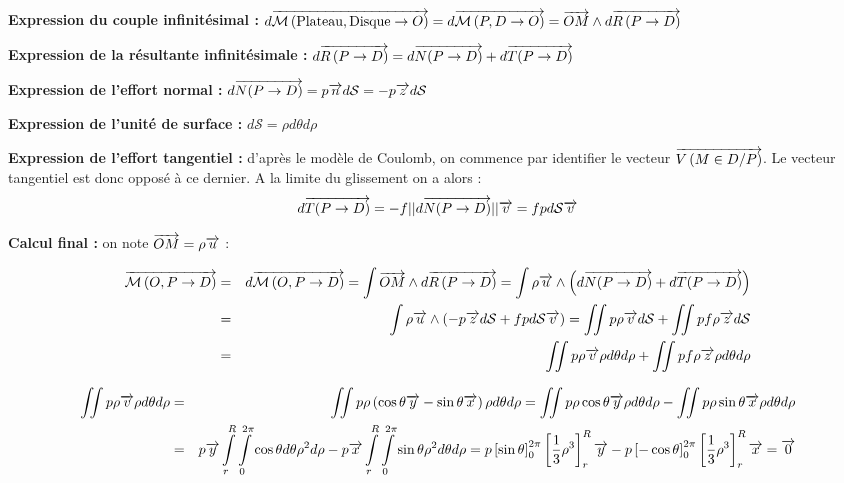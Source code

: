 \documentclass[10pt,fleqn]{article} %
\begin{document}
\textbf{Expression du couple infinitésimal : }$
d\overrightarrow{\mathcal{M}\left( {\text{Plateau}}, {\text{Disque}} \rightarrow {O}\right)} =
d\overrightarrow{\mathcal{M}\left( {P}, {D} \rightarrow {O}\right)} =  \overrightarrow{OM}\wedge d\overrightarrow{R\left( {P} \rightarrow {D}\right)}
$

\textbf{Expression de la résultante infinitésimale : } 
$d\overrightarrow{R\left( {P} \rightarrow {D}\right)} = d\overrightarrow{N(P\rightarrow D)}+d\overrightarrow{T(P\rightarrow D)}$

\textbf{Expression de l'effort normal : }
$ d\overrightarrow{N(P\rightarrow D)} = p \overrightarrow{n} d\mathcal{S} = -p \overrightarrow{z} d\mathcal{S} $

\textbf{Expression de l'unité de surface : }
$ d\mathcal{S} = \rho d\theta d\rho $

\textbf{Expression de l'effort tangentiel : } d'après le modèle de Coulomb, on commence par identifier le vecteur $\overrightarrow{V\left( {M} \in {D}/{P}\right)}$.
Le vecteur tangentiel est donc opposé à ce dernier. A la limite du glissement on a alors : 
$$
d\overrightarrow{T(P\rightarrow D)} = -f ||d\overrightarrow{N(P\rightarrow D)}|| \overrightarrow{v}    = fp d\mathcal{S}\overrightarrow{v}
$$

\textbf{Calcul final :} on note $\overrightarrow{OM}=\rho\overrightarrow{u}$ :

\begin{eqnarray*}
\overrightarrow{\mathcal{M}\left( {O}, {P} \rightarrow {D}\right)}  
&=& d\overrightarrow{\mathcal{M}\left( {O}, {P} \rightarrow {D}\right)}  =  \int \overrightarrow{OM}\wedge d\overrightarrow{R\left( {P} \rightarrow {D}\right)} = \int \rho\overrightarrow{u} \wedge \left( d\overrightarrow{N(P\rightarrow D)}+d\overrightarrow{T(P\rightarrow D)} \right)\\
&=& \int \rho\overrightarrow{u} \wedge \left( -p \overrightarrow{z} d\mathcal{S} +fp d\mathcal{S}\overrightarrow{v} \right) =  \iint p\rho\overrightarrow{v} d\mathcal{S} +\iint pf\rho  \overrightarrow{z}d\mathcal{S} \\
& =& \iint p\rho\overrightarrow{v} \rho d\theta d\rho +\iint pf\rho  \overrightarrow{z}\rho d\theta d\rho \\
\end{eqnarray*}

\begin{eqnarray*}
\iint p\rho\overrightarrow{v} \rho d\theta d\rho &=& \iint p\rho\left(\cos\theta\overrightarrow{y}-\sin\theta\overrightarrow{x} \right) \rho d\theta d\rho =\iint p\rho\cos\theta\overrightarrow{y}  \rho d\theta d\rho-\iint p\rho \sin\theta\overrightarrow{x}  \rho d\theta d\rho \\
&= &p \overrightarrow{y}  \int\limits_{r}^{R} \int\limits_{0}^{2\pi}\cos\theta d\theta \rho^2 d\rho- p\overrightarrow{x}\int\limits_{r}^{R} \int\limits_{0}^{2\pi} \sin\theta  \rho^2 d\theta d\rho = p \left[ \sin\theta\right]_{0}^{2\pi}\left[ \dfrac{1}{3}\rho^3\right]_{r}^{R}\overrightarrow{y}
 -p \left[ -\cos\theta\right]_{0}^{2\pi}\left[ \dfrac{1}{3}\rho^3\right]_{r}^{R}\overrightarrow{x} = \overrightarrow{0}
\end{eqnarray*}
\end{document}
